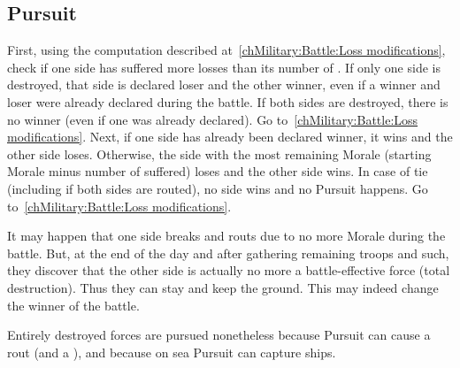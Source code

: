 \subsection{Pursuit}
\label{chMilitary:Battle:Pursuit}

\bparag First, using the computation described at~\ref{chMilitary:Battle:Loss
  modifications}, check if one side has suffered more losses than its number
of \LD.
\bparag If only one side is destroyed, that side is declared loser and the
other winner, even if a winner and loser were already declared during the
battle.
\bparag If both sides are destroyed, there is no winner (even if one was
already declared). Go to~\ref{chMilitary:Battle:Loss modifications}.
\bparag Next, if one side has already been declared winner, it wins and the
other side loses.
\bparag Otherwise, the side with the most remaining Morale (starting Morale
minus number of \textetoile suffered) loses and the other side wins.
\bparag In case of tie (including if both sides are routed), no side wins and
no Pursuit happens. Go to~\ref{chMilitary:Battle:Loss modifications}.

\begin{designnote}[Destruction]
  It may happen that one side breaks and routs due to no more Morale during
  the battle. But, at the end of the day and after gathering remaining troops
  and such, they discover that the other side is actually no more a
  battle-effective force (total destruction). Thus they can stay and keep the
  ground. This may indeed change the winner of the battle.

  Entirely destroyed forces are pursued nonetheless because Pursuit can cause
  a rout (and a ), and because on sea Pursuit can capture
  ships.
\end{designnote}

